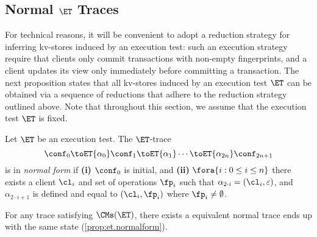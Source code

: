 \subsection{Normal \( \ET \) Traces}
\label{sec:normal-form-exist}
For technical reasons, it will be convenient to adopt a reduction strategy for inferring kv-stores induced by an 
execution test: such an execution strategy require that clients only commit transactions with non-empty fingerprints, 
and a client updates its view only immediately before committing a transaction. 
The next proposition states that all kv-stores induced by an execution test $\ET$ can be 
obtained via a sequence of reductions that adhere to the reduction strategy outlined above. 
Note that throughout this section, we assume that the execution test $\ET$ is fixed.

\begin{definition}
Let $\ET$ be an execution test. The $\ET$-trace
\[
\conf_0 \toET{\alpha_0} \conf_1 \toET{\alpha_1} \cdots \toET{\alpha_{2n}} \conf_{2n + 1}
\]
is in \emph{normal form} if \textbf{(i)} $\conf_0$ is initial, and 
\textbf{(ii)} $\fora{ i : 0 \leq i \leq n}$ there exists a client $\cl_i$ and set of operations $\fp_{i}$ such that 
$\alpha_{2 \cdot i} = (\cl_{i}, \varepsilon)$, and $\alpha_{2 \cdot i + 1}$ is defined and equal to $(\cl_{i}, \fp_{i})$ where \( \fp_i \neq \emptyset \).
\end{definition}

For any trace satisfying \( \CMs(\ET) \), 
there exists a equivalent normal trace ends up with the same state (\cref{prop:et.normalform}).

